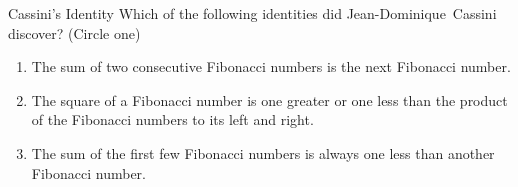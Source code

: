 \documentclass[12pt,letterpaper]{article}
\begin{document}
\begin{problem}{Cassini's Identity}
 Which of the following identities did Jean-Dominique~Cassini discover? (Circle
 one)

 \begin{enumerate}[\hspace{1em}a)]
  \item The sum of two consecutive Fibonacci numbers is the next Fibonacci
  number.
  \item The square of a Fibonacci number is one greater or one less than the
  product of the Fibonacci numbers to its left and right.
  \item The sum of the first few Fibonacci numbers is always one less than
  another Fibonacci number.
 \end{enumerate}
\end{problem}
\end{document}
